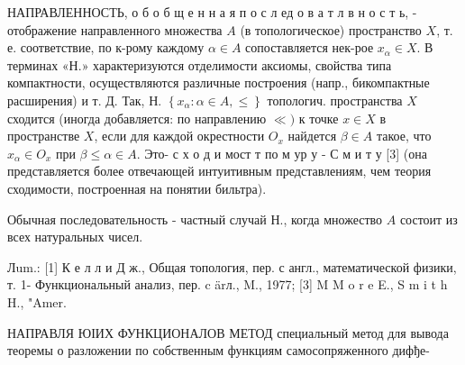 \documentclass[10pt]{article}
\begin{document}
НАПРАВЛЕННОСТЬ, о б о б щ е н н а я п о с л ед о в а т л в н о с т ь, - отображение направленного множества $A$ (в топологическое) пространство $X$, т. е. соответствие, по к-рому каждому $\alpha \in A$ сопоставляется нек-рое $x_{\alpha} \in X$. В терминах «Н.» характеризуются отделимости аксиомы, свойства типа компактности, осуществляются различные построения (напр., бикомпактные расширения) и т. Д. Так, Н. $\left\{x_{\alpha}: \alpha \in A, \leqslant\right\}$ топологич. пространства $X$ сходится (иногда добавляется: по направлению $\ll)$ к точке $x \in X$ в пространстве $X$, если для каждой окрестности $O_{x}$ найдется $\beta \in A$ такое, что $x_{\alpha} \in O_{x}$ при $\beta \leqslant \alpha \in A$. Это- с х о д и мост т по м ур у - С м и т у [3] (она представляется более отвечающей интуитивным представлениям, чем теория сходимости, построенная на понятии бильтра).



Обычная последовательность - частный случай Н., когда множество $A$ состоит из всех натуральных чисел.



Лum.: [1] К е л л и Д ж., Общая топология, пер. с англ., математической физики, т. 1- Функциональный анализ, пер. c ärл., M., 1977; [3] M M o r e E., S m i t h H., "Amer.



НАПРАВЛЯ ЮІИХ ФУНКЦИОНАЛОВ МЕТОД специальный метод для вывода теоремы о разложении по собственным функциям самосопряженного дифђе-
\end{document}
